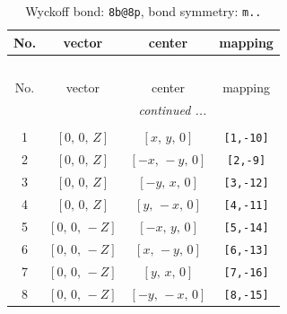 \documentclass[fleqn,8pt]{jsarticle}
\begin{document}
\begin{longtable}{cccc}
\caption{Wyckoff bond: {\tt 8b@8p}, bond symmetry: {\tt m..}}
 \\
 \hline \hline
No. & vector & center & mapping \\ \hline \endfirsthead

\multicolumn{3}{l}{\tablename\ \thetable{}} \\
 \hline \hline
No. & vector & center & mapping \\ \hline \endhead

 \hline \hline
\multicolumn{3}{r}{\footnotesize\it continued ...} \\ \endfoot

 \hline \hline
\multicolumn{3}{r}{} \\ \endlastfoot

1 & $\left[ 0,\, 0,\, Z \right]$ & $\left[ x,\, y,\, 0 \right]$ & {\tt [1,-10]} \\ \hline
2 & $\left[ 0,\, 0,\, Z \right]$ & $\left[ - x,\, - y,\, 0 \right]$ & {\tt [2,-9]} \\ \hline
3 & $\left[ 0,\, 0,\, Z \right]$ & $\left[ - y,\, x,\, 0 \right]$ & {\tt [3,-12]} \\ \hline
4 & $\left[ 0,\, 0,\, Z \right]$ & $\left[ y,\, - x,\, 0 \right]$ & {\tt [4,-11]} \\ \hline
5 & $\left[ 0,\, 0,\, - Z \right]$ & $\left[ - x,\, y,\, 0 \right]$ & {\tt [5,-14]} \\ \hline
6 & $\left[ 0,\, 0,\, - Z \right]$ & $\left[ x,\, - y,\, 0 \right]$ & {\tt [6,-13]} \\ \hline
7 & $\left[ 0,\, 0,\, - Z \right]$ & $\left[ y,\, x,\, 0 \right]$ & {\tt [7,-16]} \\ \hline
8 & $\left[ 0,\, 0,\, - Z \right]$ & $\left[ - y,\, - x,\, 0 \right]$ & {\tt [8,-15]} \\
\end{longtable}
\renewcommand{\arraystretch}{1.2}
\end{document}
